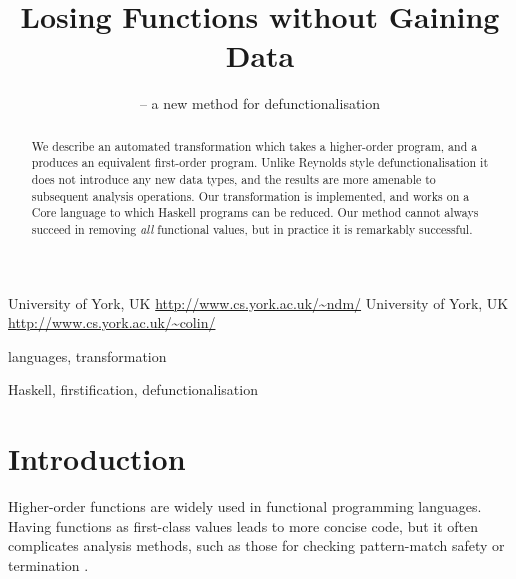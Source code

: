 \documentclass[preprint]{sigplanconf}
\begin{document}
\copyrightdata{[to be supplied]}

\titlebanner{\today{} - \currenttime{}}        %
\preprintfooter{}   %

\title{Losing Functions without Gaining Data}
\subtitle{ -- a new method for defunctionalisation}

           {University of York, UK}
           {\url{http://www.cs.york.ac.uk/~ndm/}}
           {University of York, UK}
           {\url{http://www.cs.york.ac.uk/~colin/}}

\maketitle

\begin{abstract}
We describe an automated transformation which takes a higher-order program, and a produces an equivalent first-order program. Unlike Reynolds style defunctionalisation it does not introduce any new data types, and the results are more amenable to subsequent analysis operations. Our transformation is implemented, and works on a Core language to which Haskell programs can be reduced. Our method cannot always succeed in removing \textit{all} functional values, but in practice it is remarkably successful.
\end{abstract}


\terms
languages, transformation

\keywords
Haskell, firstification, defunctionalisation

\section{Introduction}

Higher-order functions are widely used in functional programming languages.  Having functions as first-class values leads to more concise code, but it often complicates analysis methods, such as those for checking pattern-match safety \cite{me:catch_icfp} or termination \cite{sereni:higher_order_termination}.
\end{document}
